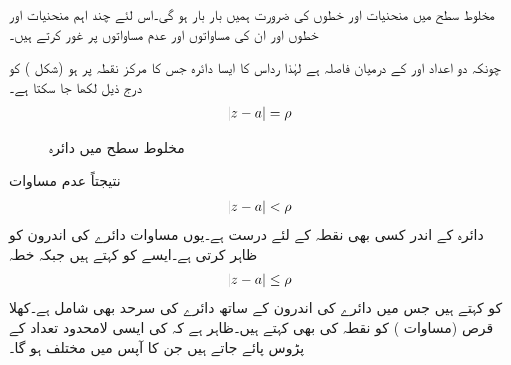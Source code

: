 مخلوط سطح  میں منحنیات اور خطوں کی ضرورت ہمیں بار بار ہو گی۔اس لئے چند اہم منحنیات اور خطوں اور ان کی مساواتوں اور عدم مساواتوں  پر غور کرتے ہیں۔

چونکہ دو اعداد  اور  کے درمیان فاصلہ  ہے لہٰذا رداس  کا ایسا دائرہ  جس کا مرکز نقطہ  پر ہو (شکل ) کو درج ذیل لکھا جا سکتا ہے۔
\begin{align}\label{مساوات_مخلوط_سطح_دائرہ_الف}
\abs{z-a}=\rho
\end{align} 
%
\begin{figure}
\centering
{}
\caption{مخلوط سطح میں دائرہ}
\label{شکل_مخلوط_سطح_دائرہ}
\end{figure}

نتیجتاً عدم مساوات
\begin{align}\label{مساوات_مخلوط_سطح_دائرہ_ب}
\abs{z-a}<\rho
\end{align}
دائرہ  کے اندر کسی بھی نقطہ کے لئے درست ہے۔یوں مساوات  دائرے کی اندرون کو ظاہر کرتی ہے۔ایسے   کو  کہتے ہیں جبکہ خطہ
\begin{align}\label{مساوات_مخلوط_سطح_دائرہ_پ}
\abs{z-a}\le \rho
\end{align}
کو  کہتے ہیں جس میں دائرے کی اندرون کے ساتھ دائرے کی سرحد بھی شامل ہے۔کھلا قرص  (مساوات ) کو نقطہ  کی  بھی کہتے ہیں۔ظاہر ہے کہ  کی ایسی لامحدود تعداد کے پڑوس پائے جاتے ہیں جن کا  آپس میں مختلف ہو گا۔

